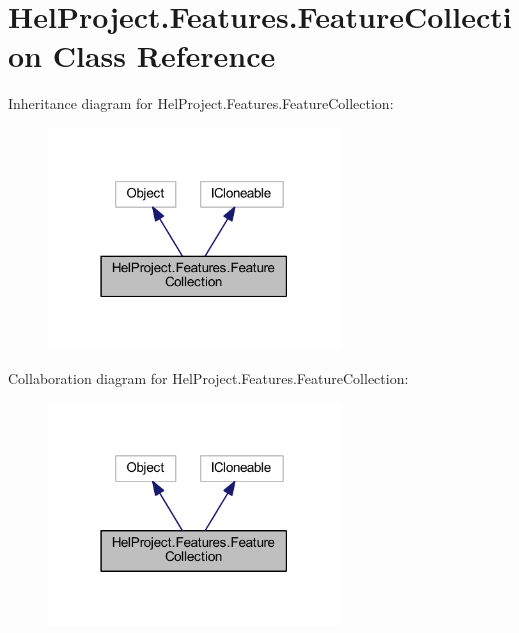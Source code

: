 \hypertarget{class_hel_project_1_1_features_1_1_feature_collection}{}\section{Hel\+Project.\+Features.\+Feature\+Collection Class Reference}
\label{class_hel_project_1_1_features_1_1_feature_collection}


Inheritance diagram for Hel\+Project.\+Features.\+Feature\+Collection\+:\nopagebreak
\begin{figure}[H]
\begin{center}
\leavevmode
\includegraphics[width=219pt]{class_hel_project_1_1_features_1_1_feature_collection__inherit__graph}
\end{center}
\end{figure}


Collaboration diagram for Hel\+Project.\+Features.\+Feature\+Collection\+:\nopagebreak
\begin{figure}[H]
\begin{center}
\leavevmode
\includegraphics[width=219pt]{class_hel_project_1_1_features_1_1_feature_collection__coll__graph}
\end{center}
\end{figure}
